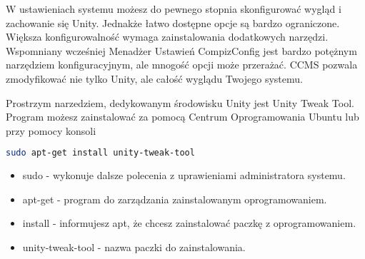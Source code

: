W \textcolor{ubuntu_orange}{ustawieniach systemu} możesz do pewnego stopnia skonfigurować wygląd i zachowanie się Unity. Jednakże łatwo dostępne opcje są bardzo ograniczone. Większa konfigurowalność wymaga zainstalowania dodatkowych narzędzi. Wspomniany wcześniej Menadżer Ustawień CompizConfig jest bardzo potężnym narzędziem konfiguracyjnym, ale mnogość opcji może przerażać. CCMS pozwala zmodyfikować nie tylko Unity, ale całość wyglądu Twojego systemu.

Prostrzym narzedziem, dedykowanym środowisku Unity jest \textcolor{ubuntu_orange}{Unity Tweak Tool}. Program możesz zainstalować za pomocą Centrum Oprogramowania Ubuntu lub przy pomocy konsoli
\begin{lstlisting}[language=bash]
sudo apt-get install unity-tweak-tool
\end{lstlisting}
\begin{itemize}
\item \textcolor{ubuntu_orange}{sudo} - wykonuje dalsze polecenia z uprawieniami administratora systemu.
\item \textcolor{ubuntu_orange}{apt-get} - program do zarządzania zainstalowanym oprogramowaniem.
\item \textcolor{ubuntu_orange}{install} - informujesz apt, że chcesz zainstalować paczkę z oprogramowaniem.
\item \textcolor{ubuntu_orange}{unity-tweak-tool} - nazwa paczki do zainstalowania.
\end{itemize}